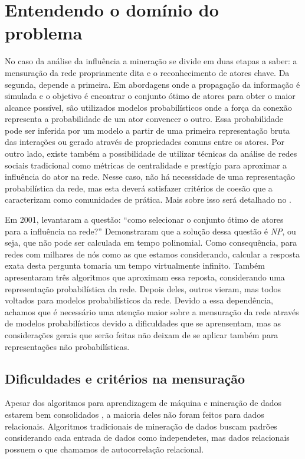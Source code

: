 \chapter{Entendendo o domínio do problema}
\label{ch:dominio}

No caso da análise da influência a mineração se divide em duas etapas a saber: a
mensuração da rede propriamente dita e o reconhecimento de atores chave. Da
segunda, depende a primeira. Em abordagens onde a propagação da informação é
simulada e o objetivo é encontrar o conjunto ótimo de atores para obter o maior
alcance possível, são utilizados modelos probabilísticos onde a força da conexão
representa a probabilidade de um ator convencer o outro. Essa probabilidade pode
ser inferida por um modelo a partir de uma primeira representação bruta das
interações ou gerado através de propriedades comuns entre os atores. Por outro
lado, existe também a possibilidade de utilizar técnicas da análise de redes
sociais tradicional como métricas de centralidade e prestígio para aproximar a
influência do ator na rede. Nesse caso, não há necessidade de uma representação
probabilística da rede, mas esta deverá satisfazer critérios de coesão que a
caracterizam como comunidades de prática. Mais sobre isso será detalhado no
.

Em 2001, \citeauthor{Domingos2001} levantaram a questão: ``como selecionar o
conjunto ótimo de atores para a influência na rede?'' Demonstraram que a solução
dessa questão é \textit{NP}, ou seja, que não pode ser calculada em tempo
polinomial. Como consequência, para redes com milhares de nós como as que estamos
considerando, calcular a resposta exata desta pergunta tomaria um tempo
virtualmente infinito. Também apresentaram três algoritmos que aproximam essa
reposta, considerando uma representação probabilística da rede. Depois deles,
outros vieram, mas todos voltados para modelos probabilísticos da rede. Devido a
essa dependência, achamos que é necessário uma atenção maior sobre a mensuração
da rede através de modelos probabilísticos devido a dificuldades que se
aprensentam, mas as considerações gerais que serão feitas não deixam de se
aplicar também para representações não probabilísticas.

\section{Dificuldades e critérios na mensuração}

Apesar dos algoritmos para aprendizagem de máquina e mineração de
dados estarem bem consolidados \citep{Cios2005}, a maioria deles não foram
feitos para dados relacionais. Algoritmos tradicionais de mineração de dados buscam
padrões considerando cada entrada de dados como independetes, mas dados
relacionais possuem o que chamamos de autocorrelação relacional.

